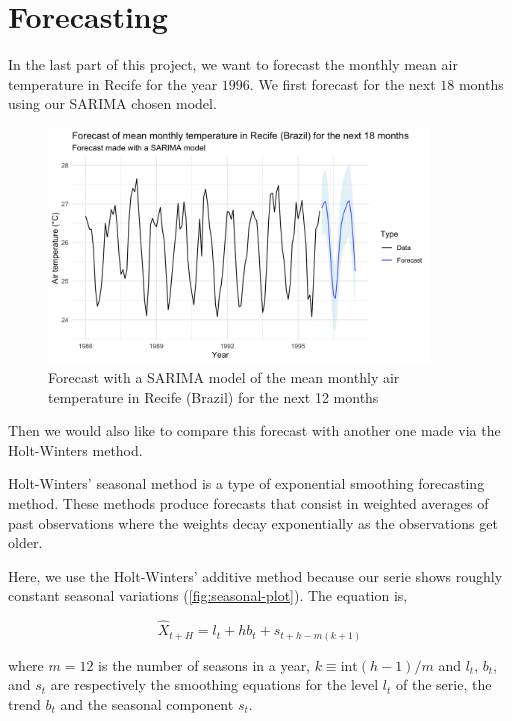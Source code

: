\section{Forecasting}

In the last part of this project, we want to forecast the monthly mean air temperature in Recife for the year $1996$. We first forecast for the next $18$ months using our SARIMA chosen model.

\begin{figure}[H]
	\centering
	\includegraphics[width=0.9\textwidth]{figures/forecast/sarima_forecast.png}
	\caption{Forecast with a SARIMA model of the mean monthly air temperature in Recife (Brazil) for the next 12 months}
	\label{fig:sarima-forecast}
\end{figure}

Then we would also like to compare this forecast with another one made via the Holt-Winters method.

Holt-Winters' seasonal method is a type of exponential smoothing forecasting method. These methods produce forecasts that consist in weighted averages of past observations where the weights decay exponentially as the observations get older.

Here, we use the Holt-Winters' additive method because our serie shows roughly constant seasonal variations (\autoref{fig:seasonal-plot}). The equation is, 

\begin{equation}
	\hat{X}_{t + H} = l_t + h b_t + s_{t + h - m(k + 1)}
\end{equation}

where $m = 12$ is the number of seasons in a year, $k \equiv \text{int}(h - 1) / m$ and $l_t$, $b_t$, and $s_t$ are respectively the smoothing equations for the level $l_t$ of the serie, the trend $b_t$ and the seasonal component $s_t$.


